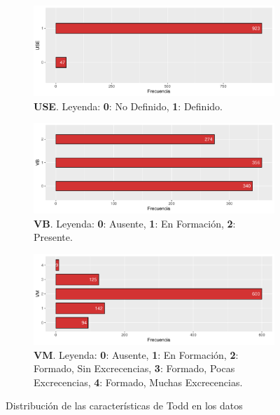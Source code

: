 \begin{figure}[p]
    \ContinuedFloat

    \begin{subfigure}{\textwidth}
        \includegraphics[width=\linewidth]{../../scripts/eda/eda_univar/char_use_distr.pdf}
        \caption{\textbf{USE}. Leyenda: \textbf{0}: No Definido, \textbf{1}: Definido.}
        \label{fig4:todd_chars__use}
    \end{subfigure}

    \begin{subfigure}{\textwidth}
        \includegraphics[width=\linewidth]{../../scripts/eda/eda_univar/char_vb_distr.pdf}
        \caption{\textbf{VB}. Leyenda: \textbf{0}: Ausente, \textbf{1}: En Formación, \textbf{2}: Presente.}
        \label{fig4:todd_chars__vb}
    \end{subfigure}

    \begin{subfigure}{\textwidth}
        \includegraphics[width=\linewidth]{../../scripts/eda/eda_univar/char_vm_distr.pdf}
        \caption{\textbf{VM}. Leyenda: \textbf{0}: Ausente, \textbf{1}: En Formación, \textbf{2}: Formado, Sin Excrecencias, \textbf{3}: Formado, Pocas Excrecencias, \textbf{4}: Formado, Muchas Excrecencias.}
        \label{fig4:todd_chars__vm}
    \end{subfigure}
    \caption[Distribución de las características de Todd]{Distribución de las características de Todd en los datos}

\end{figure}

